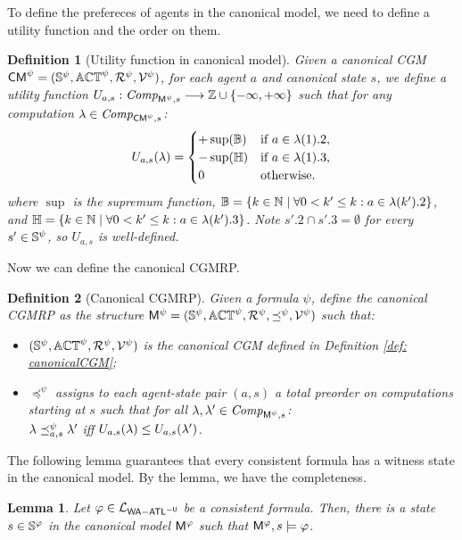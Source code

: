 \documentclass{article}
\newtheorem{definition}{Definition}
\newtheorem{lemma}{Lemma}
\begin{document}
To define the prefereces of agents in the canonical model, we need to define a utility function and the order on them. 
\begin{definition}[Utility function in canonical model]
  Given a canonical CGM $\mathsf{CM}^\psi = (\mathbb{S}^{\psi }, \mathbb{ACT}^{\psi }, \mathcal{R}^\psi, \mathcal{V}^\psi)$, for each agent $a$ and canonical state $s$, we define a utility function $U_{a,s}: \mathit{Comp}_{\mathsf{M}^\psi, s} \longrightarrow \mathbb{Z}\cup \{-\infty, +\infty\}$ such that for any computation $\lambda \in \mathit{Comp}_{\mathsf{CM}^\psi, s}$: 
\[
U_{a,s}(\lambda) = 
\begin{cases} 
+\sup(\mathbb{B}) & \text{if } a\in \lambda(1).2,\\
-\sup(\mathbb{H}) & \text{if } a\in \lambda(1).3,\\
0 & \text{otherwise.}
\end{cases}
\]
where $\sup$ is the supremum function, $\mathbb{B}=\{k\in \mathbb{N}\mid  \forall 0< k'\leq k: a\in \lambda(k').2\}$, and $\mathbb{H}=\{k\in \mathbb{N}\mid  \forall 0< k'\leq k: a\in \lambda(k').3\}$. Note $s'.2\cap s'.3=\emptyset$ for every $s'\in \mathbb{S}^\psi$, so $U_{a,s}$ is well-defined.
\end{definition}
Now we can define the canonical CGMRP. 
\begin{definition}[Canonical CGMRP]\label{def: canonicalmodel}
  Given a formula $\psi $, define the canonical CGMRP as the structure $\mathsf{M}^\psi = (\mathbb{S}^{\psi }, \mathbb{ACT}^{\psi }, \mathcal{R}^\psi, \preceq^\psi, \mathcal{V}^\psi)$ such that:
  \begin{itemize}
    \item $(\mathbb{S}^{\psi }, \mathbb{ACT}^{\psi }, \mathcal{R}^\psi, \mathcal{V}^\psi)$ is the canonical CGM defined in Definition \ref{def: canonicalCGM};
    \item $\preceq^\psi $ assigns to
    each agent-state pair
    $(a,s)$ a total preorder on computations starting at $s$
    such that for all $\lambda,\lambda'\in \mathit{Comp}_{\mathsf{M}^\psi,s}$:\\
     $\lambda \preceq^\psi_{a,s} \lambda'$ iff $U_{a,s}(\lambda) \leq U_{a,s}(\lambda')$.
  \end{itemize} 
\end{definition}

The following  lemma
guarantees that every 
consistent formula
has a witness state
in the canonical model. By the lemma, 
we have the completeness. 
\begin{lemma}\label{lem: realazation}
Let $\varphi \in \mathcal{L}_{\mathsf{WA{-}ATL}^{-\mathsf{U}}} $ be a consistent formula. Then,  there is a state $s\in \mathbb{S}^\varphi$ in the canonical model $\mathsf{M}^\varphi$ such that $\mathsf{M}^\varphi,s \models \varphi$.
\end{lemma}
\end{document}
